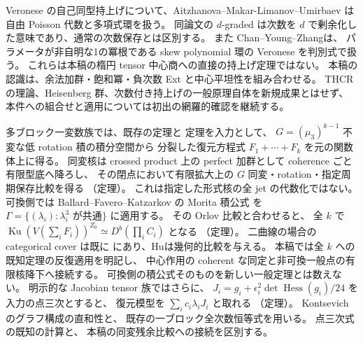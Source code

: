 Veronese の自己同型持上げについて、Aitzhanova--Makar-Limanov--Umirbaev
\cite[Theorem~1, Corollaries~4, 5]{MBCAAMU}は自由 Poisson 代数と多項式環を扱う。
同論文の $d$-graded は次数を $d$ で剰余化した意味であり、通常の次数保存とは区別する。
また Chan--Young--Zhang\cite[Theorems~0.1, 0.2]{MBCACYZ}は、
パラメータが非自明な1の冪根である skew polynomial 環の Veronese を判別式で扱う。
これらは本稿の楕円 tensor 中心商への直接の持上げ定理ではない。
本稿の認識は、余法加群・飽和冪・負次数 Ext と中心平坦性を組み合わせる。
THCR の理論、Heisenberg 群、次数付き持上げの一般原理自体を新規成果とはせず、
本件への組合せと適用については初出の網羅的確認を継続する。

多ブロック一変数族では、既存の定理と
定理を入力として、
$G=(\mu_3)^{k-1}$ 不変な低 rotation 積の積分空間から
分裂した復元方程式 $F_1+\cdots+F_k$ を元の関数体上に得る。
同変核は crossed product 上の perfect 加群として coherence ごと有限型底へ降ろし、
その閉点において有限拡大上の $G$ 同変・rotation・指定周期保存比較を得る
（定理）。
これは指定した形式核の全 jet の代数化ではない。
可換側では Ballard--Favero--Katzarkov の Morita 積公式
\cite[Definition~3.50, Corollary~5.18]{NFBFKKernels}を
$\Gamma=\{(\lambda_i):\lambda_i^3\text{ が共通}\}$ に適用する。
その Orlov 比較\cite[Theorem~6.13]{NFBFKKernels}と合わせると、
全 $k$ で $\operatorname{Ku}(V(\sum_iF_i))^{Z_0}\simeq D^b(\prod_iC_i)$ となる
（定理）。
二曲線の場合の categorical cover は既に
\cite[Example~4.7]{MBRDBFKFurther}にあり、Hu\cite{TBHu}は幾何的比較を与える。
本稿では全 $k$ への既知定理の反復適用を明記し、
中心作用の coherent な同定と非可換一般点の有限核降下へ接続する。
可換側の積公式そのものを新しい一般定理とは数えない。
明示的な Jacobian tensor 族ではさらに、
$J_i=g_i+\epsilon_i^2\det\operatorname{Hess}(g_i)/24$ を入力の点三次とすると、
復元模型を $\sum_i c_i\lambda_iJ_i$ と取れる
（定理）。
Kontsevich のグラフ構成\cite[\S\S5.1,6.1--6.3]{NFMKontsevich}の直和性と、
既存の一ブロック全次数恒等式を用いる。
点三次式の既知の計算\cite[Theorem~7.2]{MoriSmith}と、
本稿の同変残余比較への接続を区別する。

